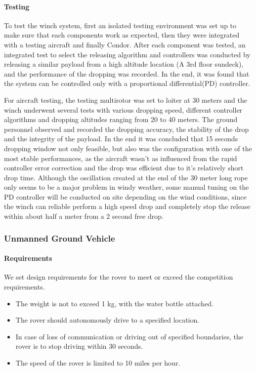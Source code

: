 \paragraph{Testing}
To test the winch system, first an isolated testing environment was set up to make sure that each components work as expected, then they were integrated with a testing aircraft and finally Condor. After each component was tested, an integrated test to select the releasing algorithm and controllers was conducted by releasing a similar payload from a high altitude location (A 3rd floor sundeck), and the performance of the dropping was recorded. In the end, it was found that the system can be controlled only with a proportional differential(PD) controller.  

For aircraft testing, the testing multirotor was set to loiter at 30 meters and the winch underwent several tests with various dropping speed, different controller algorithms and dropping altitudes ranging from 20 to 40 meters. The ground personnel observed and recorded the dropping accuracy, the stability of the drop and the integrity of the payload. In the end it was concluded that 15 seconds dropping window not only feasible, but also was the configuration with one of the most stable performances, as the aircraft wasn't as influenced from the rapid controller error correction and the drop was efficient due to it's relatively short drop time. Although the oscillation created at the end of the 30 meter long rope only seems to be a major problem in windy weather, some manual tuning on the PD controller will be conducted on site depending on the wind conditions, since the winch can reliable perform a high speed drop and completely stop the release within about half a meter from a 2 second free drop. 

\subsubsection{Unmanned Ground Vehicle}
\paragraph{Requirements} 
We set design requirements for the rover to meet or exceed the competition requirements. 
\begin{itemize}
\item The weight is not to exceed 1 kg, with the water bottle attached. 
\item The rover should autonomously drive to a specified location.
\item In case of loss of communication or driving out of specified boundaries, the rover is to stop driving within 30 seconds. 
\item The speed of the rover is limited to 10 miles per hour.
\end{itemize}

